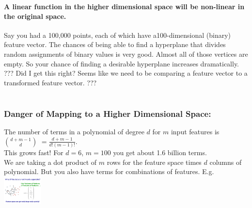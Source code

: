 \textbf{A linear function in the higher dimensional space will be non-linear in the original space.}  \hfill \\
\hfill \\

Say you had a 100,000 points, each of which have a100-dimensional (binary) feature vector.
The chances of being able to find a hyperplane that divides random assignments of binary values is very good.
Almost all of those vertices are empty.
So your chance of finding a desirable hyperplane increases dramatically.  
??? Did I get this right?  Seems like we need to be comparing a feature vector to a transformed feature vector.  
??? 
\hfill \\  \hfill \\

\subsubsection{Danger of Mapping to a Higher Dimensional Space:}
The number of terms in a polynomial of degree $d$ for $m$ input features is 
$\displaystyle {d + m - 1}\choose{d} $ $ \displaystyle = \frac{d + m - 1}{d!(m-1)!}$. \hfill \\
This grows fast!  For $d=6$, $m=100$ you get about 1.6 billion terms.  \hfill \\

We are taking a dot product of $m$ rows for the feature space times $d$ columns of polynomial. 
But you also have terms for combinations of features.  E.g. 
\includegraphics[width=0.8in]{figures/example_kernel.pdf}

